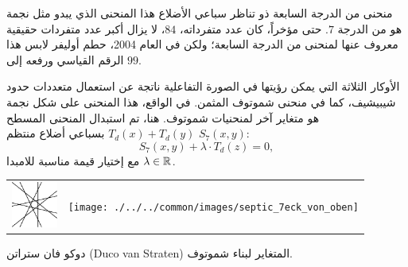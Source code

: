 \begin{surferPage}{منحنى من الدرجة السابعة ذو تناظر سباعي الأضلاع}
هذا المنحنى الذي يبدو مثل نجمة هو من الدرجة $7$. 
   حتى مؤخراً، كان عدد متفرداته، $84$، لا يزال أكبر عدد متفردات حقيقية معروف عنها لمنحنى من الدرجة السابعة؛ 
   ولكن في العام 2004، حطم أوليفر لابس هذا الرقم القياسي ورفعه إلى $99$.  
  
    الأوكار الثلاثة التي يمكن رؤيتها في الصورة التفاعلية ناتجة عن استعمال متعددات حدود شيبيشيف، كما في منحنى شموتوف المثمن.  
    في الواقع، هذا المنحنى على شكل نجمة هو متغاير آخر لمنحنيات شموتوف.
    هنا، تم استبدال المنحنى المسطح $T_d(x)+T_d(y)$ بسباعي أضلاع منتظم $S_7(x,y)$: 
   \[S_7(x,y) + \lambda \cdot T_d(z) = 0,\]
   مع إختيار قيمة مناسبة للامبدا  $\lambda\in{\mathbb R}$. 
    \vspace*{-0.3em}
    \begin{center}
      \begin{tabular}{c@{\qquad}c}
        \includegraphics[height=1.5cm]{./../../common/images/labsseptic1.pdf}
        &
        \texttt{[image: ./../../common/images/septic\_7eck\_von\_oben]}
      \end{tabular}
    \end{center}
    \vspace*{-0.3em}   
    دوكو فان ستراتن
     \textenglish{(Duco van Straten)}
     المتغاير لبناء شموتوف.
\end{surferPage}
